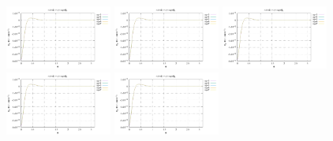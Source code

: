 \noindent
\includegraphics[width=3.5cm]{python_codes/fieldstone_152/RESULTS/exp2/err_16_m2}
\includegraphics[width=3.5cm]{python_codes/fieldstone_152/RESULTS/exp2/err_16_m3}
\includegraphics[width=3.5cm]{python_codes/fieldstone_152/RESULTS/exp2/err_16_m4}
\includegraphics[width=3.5cm]{python_codes/fieldstone_152/RESULTS/exp2/err_16_m5}
\includegraphics[width=3.5cm]{python_codes/fieldstone_152/RESULTS/exp2/err_16_m6}

